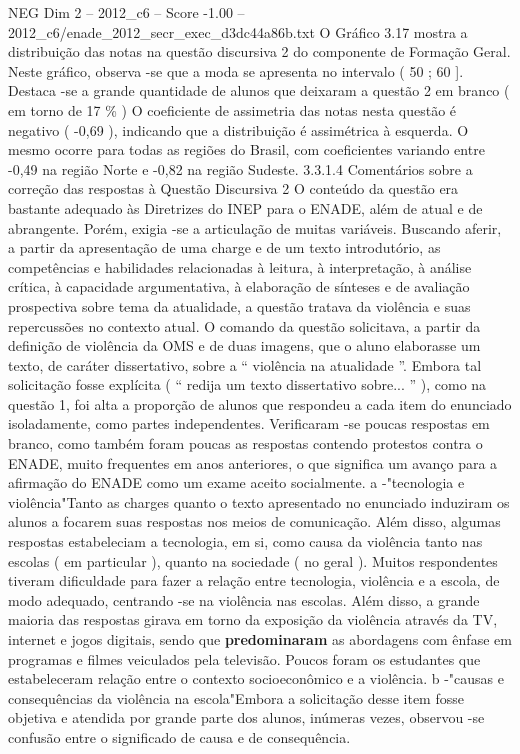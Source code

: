 \begin{textsample}{NEG Dim 2 – 2012\_c6 – Score -1.00 – 2012\_c6/enade\_2012\_secr\_exec\_d3dc44a86b.txt}
O Gráfico 3.17 mostra a distribuição das notas na questão discursiva 2 do componente de Formação Geral.
Neste gráfico, observa -se que a moda se apresenta no intervalo ( 50 ; 60 ].
Destaca -se a grande quantidade de alunos que deixaram a questão 2 em branco ( em torno de 17 \% ) O coeficiente de assimetria das notas nesta questão é negativo ( -0,69 ), indicando que a distribuição é assimétrica à esquerda.
O mesmo ocorre para todas as regiões do Brasil, com coeficientes variando entre -0,49 na região Norte e -0,82 na região Sudeste. 3.3.1.4 Comentários sobre a correção das respostas à Questão Discursiva 2 O conteúdo da questão era bastante adequado às Diretrizes do INEP para o ENADE, além de atual e de abrangente.
Porém, exigia -se a articulação de muitas variáveis.
Buscando aferir, a partir da apresentação de uma charge e de um texto introdutório, as competências e habilidades relacionadas à leitura, à interpretação, à análise crítica, à capacidade argumentativa, à elaboração de sínteses e de avaliação prospectiva sobre tema da atualidade, a questão tratava da violência e suas repercussões no contexto atual.
O comando da questão solicitava, a partir da definição de violência da OMS e de duas imagens, que o aluno elaborasse um texto, de caráter dissertativo, sobre a “ violência na atualidade ”.
Embora tal solicitação fosse explícita ( “ redija um texto dissertativo sobre... ” ), como na questão 1, foi alta a proporção de alunos que respondeu a cada item do enunciado isoladamente, como partes independentes.
Verificaram -se poucas respostas em branco, como também foram poucas as respostas contendo protestos contra o ENADE, muito frequentes em anos anteriores, o que significa um avanço para a afirmação do ENADE como um exame aceito socialmente. a -"tecnologia e violência"Tanto as charges quanto o texto apresentado no enunciado induziram os alunos a focarem suas respostas nos meios de comunicação.
Além disso, algumas respostas estabeleciam a tecnologia, em si, como causa da violência tanto nas escolas ( em particular ), quanto na sociedade ( no geral ).
Muitos respondentes tiveram dificuldade para fazer a relação entre tecnologia, violência e a escola, de modo adequado, centrando -se na violência nas escolas.
Além disso, a grande maioria das respostas girava em torno da exposição da violência através da TV, internet e jogos digitais, sendo que \textbf{predominaram} as abordagens com ênfase em programas e filmes veiculados pela televisão.
Poucos foram os estudantes que estabeleceram relação entre o contexto socioeconômico e a violência. b -"causas e consequências da violência na escola"Embora a solicitação desse item fosse objetiva e atendida por grande parte dos alunos, inúmeras vezes, observou -se confusão entre o significado de causa e de consequência.

\end{textsample}
